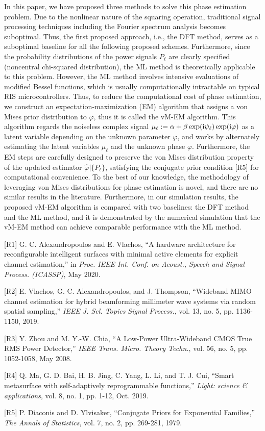 \documentclass[a4paper,12pt]{article}
\def \ri {{\rm i}}
\begin{document}
{{In this paper, we have proposed three methods to solve this phase estimation problem. Due to the nonlinear nature of the squaring operation, traditional signal processing techniques including the Fourier spectrum analysis becomes suboptimal. Thus, the first proposed approach, i.e., the DFT method, serves as a suboptimal baseline for all the following proposed schemes. Furthermore, since the probability distributions of the power signals $P_\ell$ are clearly specified (noncentral chi-squared distribution), the ML method is theoretically applicable to this problem. However, the ML method involves intensive evaluations of modified Bessel functions, which is usually computationally intractable on typical RIS microcontrollers. 
Thus, to reduce the computational cost of phase estimation, we construct an expectation-maximization (EM) algorithm that assigns a von Mises prior distribution to $\varphi$, thus it is called the vM-EM algorithm. 
This algorithm regards the noiseless complex signal $\mu_\ell := \alpha+\beta\exp(\ri\psi_\ell)\exp(\ri\varphi)$ as a latent variable depending on the unknown parameter $\varphi$, and works by alternately estimating the latent variables $\mu_\ell$ and the unknown phase $\varphi$. 
Furthermore, the EM steps are carefully designed to preserve the von Mises distribution property of the updated estimator $\hat{\varphi}|\{P_\ell\}$, satisfying the conjugate prior condition [R5] for computational convenience. 
To the best of our knowledge, the methodology of leveraging von Mises distributions for phase estimation is novel, and there are no similar results in the literature. 
Furthermore, in our simulation results, the proposed vM-EM algorithm is compared with two baselines: the DFT method and the ML method, and it is demonstrated by the numerical simulation that the vM-EM method can achieve comparable performance with the ML method. 

[R1] G. C. Alexandropoulos and E. Vlachos, ``A hardware architecture for reconfigurable intelligent surfaces with minimal active elements for explicit channel estimation,'' in {\it Proc. IEEE Int. Conf. on Acoust., Speech
and Signal Process. (ICASSP)}, May 2020. 

[R2] E. Vlachos, G. C. Alexandropoulos, and J. Thompson, ``Wideband MIMO channel estimation for hybrid beamforming millimeter wave systems via random spatial sampling,'' {\it IEEE J. Sel. Topics Signal Process.}, vol. 13, no. 5, pp. 1136-1150, 2019.

[R3] Y. Zhou and M. Y.-W. Chia, ``A Low-Power Ultra-Wideband CMOS True RMS Power Detector,'' {\it IEEE Trans. Micro. Theory Techn.}, vol. 56, no. 5, pp. 1052-1058, May 2008. 

[R4] Q. Ma, G. D. Bai, H. B. Jing, C. Yang, L. Li, and T. J. Cui, ``Smart metasurface with self-adaptively reprogrammable functions,'' {\it Light: science \& applications}, vol. 8, no. 1, pp. 1-12, Oct. 2019.

[R5] P. Diaconis and D. Ylvisaker, ``Conjugate Priors for Exponential Families,'' {\it The Annals of Statistics}, vol. 7, no. 2, pp. 269-281, 1979.


}}
\end{document}
